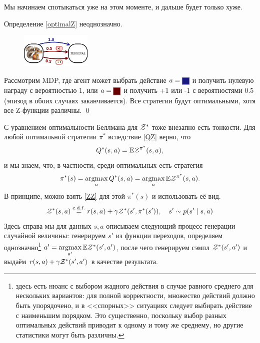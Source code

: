 Мы начинаем спотыкаться уже на этом моменте, и дальше будет только хуже.

\begin{theorem}
Определение \eqref{optimalZ} неоднозначно.

\begin{figure}
\vspace{-0.7cm}
\centering
\includegraphics[width=0.3\textwidth]{Images/optimalZissue.png}
\end{figure}
\beginproof
Рассмотрим MDP, где агент может выбрать действие $a \HM= \colorsquare{ChadBlue}$ и получить нулевую награду с вероятностью 1, или $a \HM = \colorsquare{ChadRed}$ и получить +1 или -1 с вероятностями 0.5 (эпизод в обоих случаях заканчивается). Все стратегии будут оптимальными, хотя все Z-функции различны. \qed
\end{theorem}

С уравнением оптимальности Беллмана для $\mathcal{Z}^*$ тоже внезапно есть тонкости. Для любой оптимальной стратегии  $\pi^*$ вследствие \eqref{QZ} верно, что
$$Q^*(s, a) = \mathbb{E} \mathcal{Z}^{\pi^*}(s, a),$$
и мы знаем, что, в частности, среди оптимальных есть стратегия
$$\pi^*(s) = \mathop{\mathrm{argmax}}\limits_a Q^*(s, a) = \mathop{\mathrm{argmax}}\limits_a \mathbb{E} \mathcal{Z}^{\pi^*}(s, a).$$
В принципе, можно взять \eqref{ZZ} для этой $\pi^*(s)$ и использовать её вид.
\begin{equation}\label{Z*Z*}
\mathcal{Z}^*(s, a) \mathrel{\stackrel{\mathrm{c.d.f.}}=} r(s, a) + \gamma \mathcal{Z}^*(s', \pi^*(s')), \quad s' \sim p(s' \mid s, a)
\end{equation}
Здесь справа мы для данных $s, a$ описываем следующий процесс генерации случайной величины: генерируем $s'$ из функции переходов, определяем однозначно\footnote{здесь есть нюанс с выбором жадного действия в случае равного среднего для нескольких вариантов: для полной корректности, множество действий должно быть упорядочено, и в <<спорных>> ситуациях следует выбирать действие с наименьшим порядком. Это существенно, поскольку выбор разных оптимальных действий приводит к одному и тому же среднему, но другие статистики могут быть различны.} $a' = \mathop{\mathrm{argmax}}\limits_{a'} \mathbb{E} \mathcal{Z}^*(s', a')$, после чего генерируем сэмпл $\mathcal{Z}^*(s', a')$ и выдаём $r(s, a) + \gamma \mathcal{Z}^*(s', a')$ в качестве результата.

